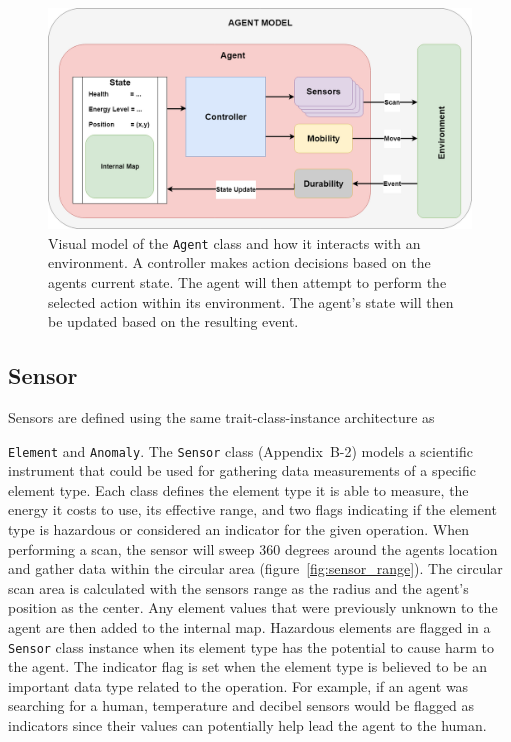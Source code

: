 \begin{figure}[!htb]
  \centering
  \includegraphics[width=1.0\columnwidth]{Figures/agent_model.png}
  \caption[Agent-Environment Interaction Diagram]{Visual model of the \texttt{Agent} class and how it interacts with an environment. A controller makes action decisions based on the agents current state. The agent will then attempt to perform the selected action within its environment. The agent's state will then be updated based on the resulting event.}
  \label{fig:agent_model}
\end{figure}


\subsection{Sensor} \label{subsec:sensor}
Sensors are defined using the same trait-class-instance architecture as

\noindent
\texttt{Element} and \texttt{Anomaly}.
The \texttt{Sensor} class (Appendix~B-2) models a scientific instrument that could be used for gathering data measurements of a specific element type.
Each class defines the element type it is able to measure, the energy it costs to use, its effective range, and two flags indicating if the element type is hazardous or considered an indicator for the given operation.
When performing a scan, the sensor will sweep 360 degrees around the agents location and gather data within the circular area (figure~\ref{fig:sensor_range}).
The circular scan area is calculated with the sensors range as the radius and the agent's position as the center.
Any element values that were previously unknown to the agent are then added to the internal map.
Hazardous elements are flagged in a \texttt{Sensor} class instance when its element type has the potential to cause harm to the agent.
The indicator flag is set when the element type is believed to be an important data type related to the operation.
For example, if an agent was searching for a human, temperature and decibel sensors would be flagged as indicators since their values can potentially help lead the agent to the human.

